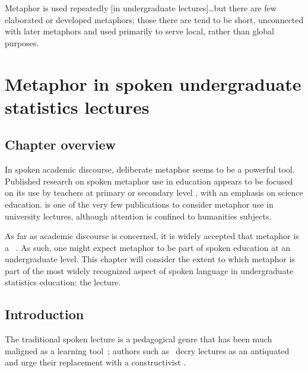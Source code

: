 
\begin{singlespace}
\begin{savequote}[105mm]
Metaphor is used repeatedly [in undergraduate lectures]\ldots but
there are few elaborated or developed metaphors; those there are tend
to be short, unconnected with later metaphors and used primarily to
serve local, rather than global purposes.  
\end{savequote}
\end{singlespace}

\chapter{Metaphor in spoken undergraduate statistics lectures}
\label{chapter4}

\section{Chapter overview}

In spoken academic discourse, deliberate metaphor seems to be a
powerful tool.  Published research on spoken metaphor use in education
appears to be focused on its use by teachers at primary or secondary
level \parencite{munby1986,cameron2003}, with an emphasis on science
education.   is one of the very few publications to
consider metaphor use in university lectures, although attention is
confined to humanities subjects.

As far as academic discourse is concerned, it is widely accepted that
metaphor is a ~\parencite{beger2015}.  As such, one might
expect metaphor to be part of spoken education at an undergraduate
level.  This chapter will consider the extent to which metaphor is
part of the most widely recognized aspect of spoken language in
undergraduate statistics education: the lecture.

\section{Introduction}

The traditional spoken lecture is a pedagogical genre that has been
much maligned as a learning tool~\parencite{friesen2011}; authors such
as~ decry lectures as an antiquated  and urge their replacement with a constructivist
. 

